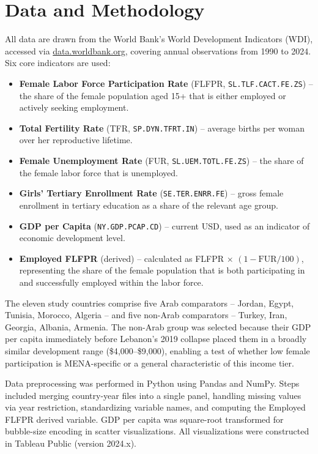 \documentclass[12pt,a4paper]{article}
\begin{document}
\section{Data and Methodology}
\label{sec:data}

All data are drawn from the World Bank's World Development Indicators (WDI), accessed via \url{data.worldbank.org}, covering annual observations from 1990 to 2024. Six core indicators are used:

\begin{itemize}[noitemsep]
  \item \textbf{Female Labor Force Participation Rate} (FLFPR, \texttt{SL.TLF.CACT.FE.ZS}) -- the share of the female population aged 15+ that is either employed or actively seeking employment.
  \item \textbf{Total Fertility Rate} (TFR, \texttt{SP.DYN.TFRT.IN}) -- average births per woman over her reproductive lifetime.
  \item \textbf{Female Unemployment Rate} (FUR, \texttt{SL.UEM.TOTL.FE.ZS}) -- the share of the female labor force that is unemployed.
  \item \textbf{Girls' Tertiary Enrollment Rate} (\texttt{SE.TER.ENRR.FE}) -- gross female enrollment in tertiary education as a share of the relevant age group.
  \item \textbf{GDP per Capita} (\texttt{NY.GDP.PCAP.CD}) -- current USD, used as an indicator of economic development level.
  \item \textbf{Employed FLFPR} (derived) -- calculated as FLFPR $\times$ $(1 - \text{FUR}/100)$, representing the share of the female population that is both participating in and successfully employed within the labor force.
\end{itemize}

The eleven study countries comprise five Arab comparators -- Jordan, Egypt, Tunisia, Morocco, Algeria -- and five non-Arab comparators -- Turkey, Iran, Georgia, Albania, Armenia. The non-Arab group was selected because their GDP per capita immediately before Lebanon's 2019 collapse placed them in a broadly similar development range (\$4{,}000--\$9{,}000), enabling a test of whether low female participation is MENA-specific or a general characteristic of this income tier.

Data preprocessing was performed in Python using Pandas and NumPy. Steps included merging country-year files into a single panel, handling missing values via year restriction, standardizing variable names, and computing the Employed FLFPR derived variable. GDP per capita was square-root transformed for bubble-size encoding in scatter visualizations. All visualizations were constructed in Tableau Public (version 2024.x).
\end{document}

